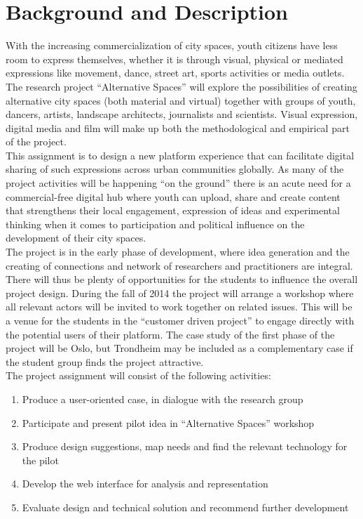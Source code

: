\section{Background and Description}
With the increasing commercialization of city spaces, youth citizens have less room to express themselves, whether it is through visual, physical or mediated expressions like movement, dance, street art, sports activities or media outlets. The research project “Alternative Spaces” will explore the possibilities of creating alternative city spaces (both material and virtual) together with groups of youth, dancers, artists, landscape architects, journalists and scientists. Visual expression, digital media and film will make up both the methodological and empirical part of the project. \\
\indent This assignment is to design a new platform experience that can facilitate digital sharing of such expressions across urban communities globally. As many of the project activities will be happening “on the ground” there is an acute need for a commercial-free digital hub where youth can upload, share and create content that strengthens their local engagement, expression of ideas and experimental thinking when it comes to participation and political influence on the development of their city spaces.\\
\indent The project is in the early phase of development, where idea generation and the creating of connections and network of researchers and practitioners are integral. There will thus be plenty of opportunities for the students to influence the overall project design. During the fall of 2014 the project will arrange a workshop where all relevant actors will be invited to work together on related issues. This will be a venue for the students in the “customer driven project” to engage directly with the potential users of their platform. The case study of the first phase of the project will be Oslo, but Trondheim may be included as a complementary case if the student group finds the project attractive. \\
The project assignment will consist of the following activities:
\begin{enumerate}
\item Produce a user-oriented case, in dialogue with the research group
\item Participate and present pilot idea in “Alternative Spaces” workshop
\item Produce design suggestions, map needs and find the relevant technology for the pilot
\item Develop the web interface for analysis and representation
\item Evaluate design and technical solution and recommend further development
\end{enumerate}

